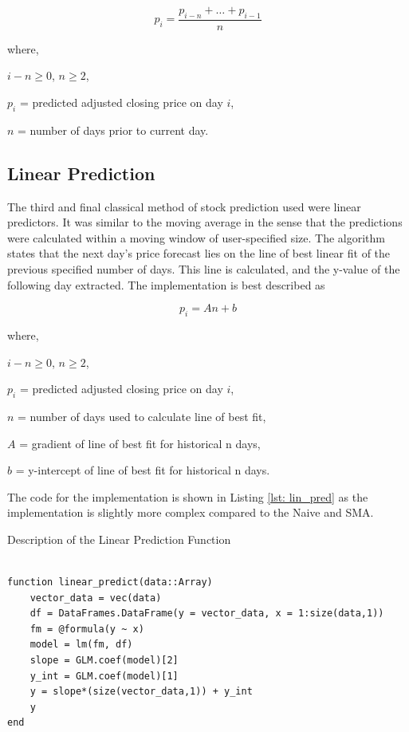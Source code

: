 \begin{equation}
    \label{eqn: pred_sma}
    p_{i} = \frac{p_{i-n}+\dots+p_{i-1}}{n}
\end{equation}

\noindent where, 

$i-n \geq 0$, $n \geq 2$, 

$p_i$ = predicted adjusted closing price on day $i$, 

$n$ = number of days prior to current day. 

\subsection{Linear Prediction}
The third and final classical method of stock prediction used were linear predictors. It was similar to the moving average in the sense that the predictions were calculated within a moving window of user-specified size. The algorithm states that the next day’s price forecast lies on the line of best linear fit 
of the previous specified number of days. This line is calculated, and the y-value of the following day extracted. The implementation is best described as

\begin{equation}
    \label{eqn: pred_lin}
    p_{i} = An + b
\end{equation}

\noindent where, 

$i-n \geq 0$, $n \geq 2$, 

$p_i$ = predicted adjusted closing price on day $i$, 

$n$ = number of days used to calculate line of best fit,

$A$ = gradient of line of best fit for historical n days,

$b$ = y-intercept of line of best fit for historical n days. 

\noindent The code for the implementation is shown in Listing \ref{lst: lin_pred} as the implementation is slightly more complex compared to the Naive and SMA.

\begin{listing}[h]
\caption{Description of the Linear Prediction Function}
\label{lst: lin_pred}
\begin{verbatim}

function linear_predict(data::Array)
    vector_data = vec(data)
    df = DataFrames.DataFrame(y = vector_data, x = 1:size(data,1))
    fm = @formula(y ~ x)
    model = lm(fm, df)
    slope = GLM.coef(model)[2]
    y_int = GLM.coef(model)[1]
    y = slope*(size(vector_data,1)) + y_int
    y
end

\end{verbatim}
\end{listing}


